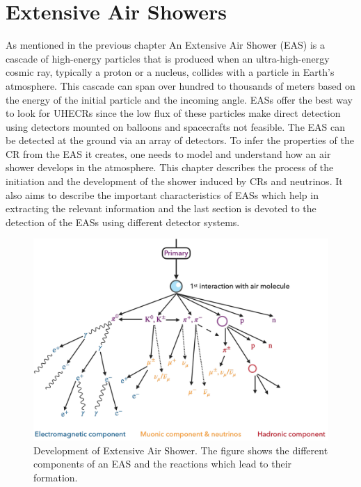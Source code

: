 
\chapter{Extensive Air Showers}
\label{chap:EAS}

As mentioned in the previous chapter An Extensive Air Shower (EAS) is a cascade of high-energy particles that is produced when an ultra-high-energy cosmic ray, typically a proton or a nucleus, collides with a particle in Earth's atmosphere. This cascade can span over hundred to thousands of meters based on the energy of the initial particle and the incoming angle. EASs offer the best way to look for UHECRs since the low flux of these particles make direct detection using detectors mounted on balloons and spacecrafts not feasible. The EAS can be detected at the ground via an array of detectors. To infer the properties of the CR from the EAS it creates, one needs to model and understand how an air shower develops in the atmosphere. This chapter describes the process of the initiation and the development of the shower induced by CRs and neutrinos. It also aims to describe the important characteristics of EASs which help in extracting the relevant information and the last section is devoted to the detection of the EASs using different detector systems. 

\begin{figure}[t!]
    \centering
    \includegraphics[width=14.5cm]{thesis_figures/EAS/EAS_reactions.pdf}
    \caption{Development of Extensive Air Shower. The figure shows the different components of an EAS and the reactions which lead to their formation.}
    \label{fig:EAS_components}
\end{figure}

